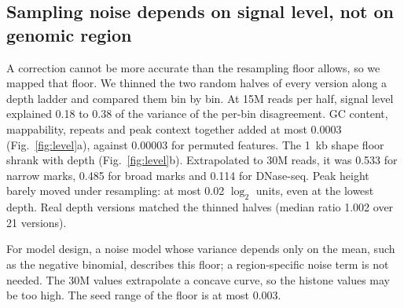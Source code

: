 \documentclass[pdflatex,sn-mathphys-num]{sn-jnl}
\newcommand{\lit}[1]{#1}
\newcommand{\featMaxFifteen}{0.0003}
\newcommand{\lvlFifteenHi}{0.38}
\newcommand{\lvlFifteenLo}{0.18}
\newcommand{\peakFloorAll}{0.02}
\newcommand{\realN}{21}
\newcommand{\realRead}{1.002}
\newcommand{\shSpreadHi}{0.003}
\newcommand{\shThirtyBr}{0.485}
\newcommand{\shThirtyDn}{0.114}
\newcommand{\shThirtyNar}{0.533}
\newcommand{\shufMax}{0.00003}
\begin{document}
\subsection{Sampling noise depends on signal level, not on genomic region}\label{sec:r3}

A correction cannot be more accurate than the resampling floor allows, so we mapped that
floor. We thinned the two random halves of every version along a depth ladder and compared
them bin by bin. At \lit{15}M reads per half, signal level explained \lvlFifteenLo{} to
\lvlFifteenHi{} of the variance of the per-bin disagreement. GC content, mappability, repeats
and peak context together added at most \featMaxFifteen{} (Fig.~\ref{fig:level}a), against
\shufMax{} for permuted features. The \lit{1}~kb shape floor shrank with depth
(Fig.~\ref{fig:level}b). Extrapolated to \lit{30}M reads, it was \shThirtyNar{} for narrow marks,
\shThirtyBr{} for broad marks and \shThirtyDn{} for DNase-seq. Peak height barely moved under
resampling: at most \peakFloorAll{} $\log_{\lit{2}}$ units, even at the lowest depth. Real depth
versions matched the thinned halves (median ratio \realRead{} over \realN{} versions).

For model design, a noise model whose variance depends only on the mean, such as the negative
binomial, describes this floor; a region-specific noise term is not needed. The
\lit{30}M values extrapolate a concave curve, so the histone values may be too high. The seed
range of the floor is at most \shSpreadHi{}.
\end{document}
